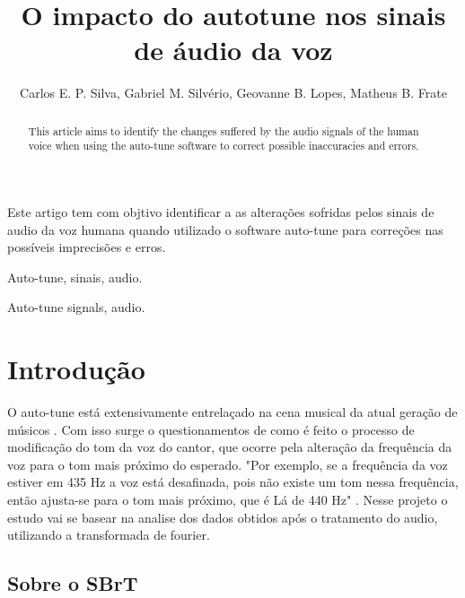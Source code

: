 \documentclass{sbrt}
\begin{document}
\title{O impacto do autotune nos sinais de áudio da voz}

\author{Carlos E. P. Silva, Gabriel M. Silvério, Geovanne B. Lopes, Matheus B. Frate}

\maketitle


\begin{resumo}
Este artigo tem com objtivo identificar a as alterações sofridas pelos sinais de audio da voz humana quando utilizado o software auto-tune para correções nas possíveis imprecisões e erros.
\end{resumo}

\begin{chave}
Auto-tune, sinais, audio.
\end{chave}


\begin{abstract}
This article aims to identify the changes suffered by the audio signals of the human voice when using the auto-tune software to correct possible inaccuracies and errors.
\end{abstract}

\begin{keywords}
Auto-tune signals, audio.
\end{keywords}


\section{Introdução}

O auto-tune está extensivamente entrelaçado na cena musical da atual geração de músicos \cite{ref1}. Com isso surge o questionamentos de como é feito o processo de modificação do tom da voz do cantor, que ocorre pela alteração da frequência da voz para o tom mais próximo do esperado.
"Por exemplo, se a frequência da voz estiver em 435 Hz a voz está desafinada, pois não existe um tom nessa frequência, então ajusta-se para o tom mais próximo, que é Lá de 440 Hz" \cite{ref2}. Nesse projeto o estudo vai se basear na analise dos dados obtidos após o tratamento do audio, utilizando a transformada de fourier.


\subsection{Sobre o SBrT}
\end{document}
